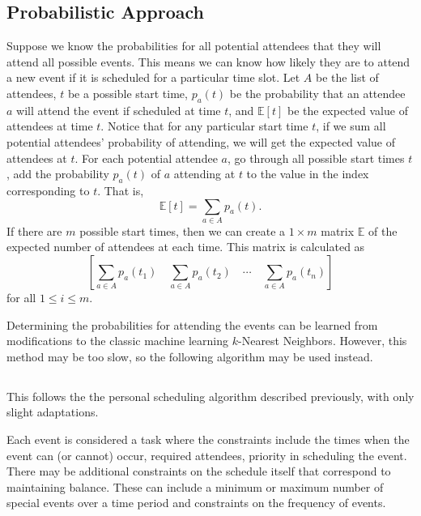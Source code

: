 \documentclass{article}
\newcommand{\todo}[1]{}
\begin{document}
	\subsection{Probabilistic Approach}
		Suppose we know the probabilities for all potential attendees that they will attend all possible events.
		This means we can know how likely they are to attend a new event if it is scheduled for a particular time slot.
		Let $A$ be the list of attendees, $t$ be a possible start time, $p_a(t)$ be the probability that an attendee $a$ will attend the event if scheduled at time $t$, and $\mathbb{E}[t]$ be the expected value of attendees at time $t$.
		Notice that for any particular start time $t$, if we sum all potential attendees' probability of attending, we will get the expected value of attendees at $t$.
		For each potential attendee $a$, go through all possible start times $t$, add the probability $p_a(t)$ of $a$ attending at $t$ to the value in the index corresponding to $t$.
		That is, 
		\[ \mathbb{E}[t] = \sum_{a \in A} p_a(t). \]
		If there are $m$ possible start times, then we can create a $1 \times m$ matrix $\mathbb{E}$ of the expected number of attendees at each time.
		This matrix is calculated as
		\[  \todo{``Fix matrix formatting''}
			\left[ \sum_{a \in A} p_a(t_1) \quad \sum_{a \in A} p_a(t_2) \quad  \cdots \quad \sum_{a \in A} p_a(t_n) \right]
		\]
		for all $1 \le i \le m$.
	
		Determining the probabilities for attending the events can be learned from modifications to the classic machine learning $k$-Nearest Neighbors.
		However, this method may be too slow, so the following algorithm may be used instead.
		
	\subsection{}
		This follows the the personal scheduling algorithm described previously, with only slight adaptations.
		
		Each event is considered a task where the constraints include the times when the event can (or cannot) occur, required attendees, priority in scheduling the event.
		There may be additional constraints on the schedule itself that correspond to maintaining balance.
		These can include a minimum or maximum number of special events over a time period and constraints on the frequency of events.
\end{document}
